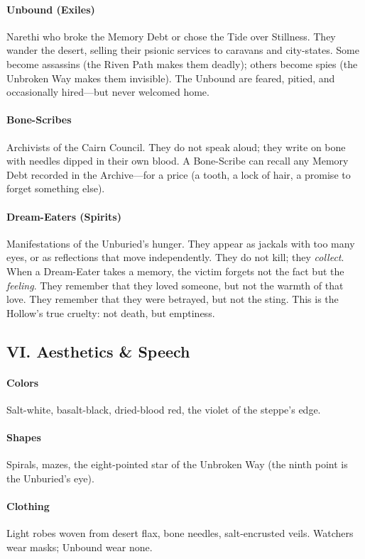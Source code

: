 \documentclass[11pt]{article}
\begin{document}
\paragraph{Unbound (Exiles)} Narethi who broke the Memory Debt or chose the Tide over Stillness. They wander the desert, selling their psionic services to caravans and city-states. Some become assassins (the Riven Path makes them deadly); others become spies (the Unbroken Way makes them invisible). The Unbound are feared, pitied, and occasionally hired---but never welcomed home.

\paragraph{Bone-Scribes} Archivists of the Cairn Council. They do not speak aloud; they write on bone with needles dipped in their own blood. A Bone-Scribe can recall any Memory Debt recorded in the Archive---for a price (a tooth, a lock of hair, a promise to forget something else).

\paragraph{Dream-Eaters (Spirits)} Manifestations of the Unburied's hunger. They appear as jackals with too many eyes, or as reflections that move independently. They do not kill; they \textit{collect}. When a Dream-Eater takes a memory, the victim forgets not the fact but the \textit{feeling}. They remember that they loved someone, but not the warmth of that love. They remember that they were betrayed, but not the sting. This is the Hollow's true cruelty: not death, but emptiness.

\subsection*{VI. Aesthetics \& Speech}
\paragraph{Colors} Salt-white, basalt-black, dried-blood red, the violet of the steppe's edge.
\paragraph{Shapes} Spirals, mazes, the eight-pointed star of the Unbroken Way (the ninth point is the Unburied's eye).
\paragraph{Clothing} Light robes woven from desert flax, bone needles, salt-encrusted veils. Watchers wear masks; Unbound wear none.
\end{document}
